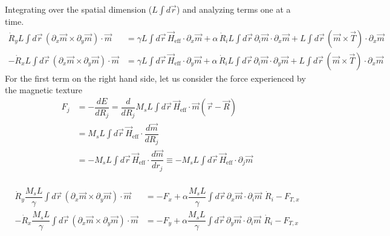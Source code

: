 \documentclass[aps,prb,onecolumn,notitlepage,showpacs,floatfix,superscriptaddress]{revtex4-1}
\newcommand{\mrm}[1]{\mathrm{#1}}
\begin{document}
Integrating over the spatial dimension ($L\int d\vec{r}$) and analyzing terms one at a time. 
\begin{equation}
\begin{split}
\dot{R}_y L\int d\vec{r}\,(\partial_x \vec{m} \times \partial_y \vec{m}) \cdot  \vec{m} &= \gamma L\int d\vec{r}\,\vec{H}_\mrm{eff} \cdot \partial_x \vec{m} + \alpha \, \dot{R}_i L\int d\vec{r}\, \partial_i \vec{m} \cdot \partial_x \vec{m} + L\int d\vec{r}\, (\vec{m} \times \vec{T}) \cdot \partial_x \vec{m}\\
-\dot{R}_x L\int d\vec{r}\, (\partial_x \vec{m} \times \partial_y \vec{m}) \cdot  \vec{m} &= \gamma L\int d\vec{r}\,\vec{H}_\mrm{eff} \cdot \partial_y \vec{m} + \alpha \, \dot{R}_i L\int d\vec{r}\, \partial_i \vec{m} \cdot \partial_y \vec{m} + L\int d\vec{r}\, (\vec{m} \times \vec{T}) \cdot \partial_x \vec{m}
\end{split}
\end{equation}
For the first term on the right hand side, let us consider the force experienced by the magnetic texture
\begin{equation}
\begin{split}
F_j &= - \dfrac{dE}{dR_j} = \dfrac{d}{dR_j} M_s L \int d\vec{r} \, \vec{H}_\mrm{eff} \cdot \vec{m}(\vec{r}-\vec{R}) \\
&=  M_s L \int d\vec{r} \, \vec{H}_\mrm{eff} \cdot \dfrac{d \vec{m}}{dR_j} \\
&= - M_s L \int d\vec{r} \, \vec{H}_\mrm{eff} \cdot \dfrac{d \vec{m}}{dr_j} \equiv - M_s L \int d\vec{r} \, \vec{H}_\mrm{eff} \cdot \partial_j \vec{m}\\
\end{split}
\end{equation}
\begin{widetext}
\begin{equation}
\begin{split}
\dot{R}_y \dfrac{M_s L}{\gamma}\int d\vec{r}\,(\partial_x \vec{m} \times \partial_y \vec{m}) \cdot  \vec{m} &= -F_x + \alpha \dfrac{M_s L}{\gamma} \int d\vec{r}\, \partial_x \vec{m} \cdot \partial_i \vec{m} \,\, \dot{R}_i  - F_{T,x}\\
-\dot{R}_x \dfrac{M_s L}{\gamma}\int d\vec{r}\, (\partial_x \vec{m} \times \partial_y \vec{m}) \cdot  \vec{m} &= -F_y + \alpha \dfrac{M_s L}{\gamma} \int d\vec{r}\, \partial_y \vec{m} \cdot \partial_i \vec{m} \,\, \dot{R}_i  - F_{T,x}\\
\end{split}
\end{equation}
\end{widetext}
\end{document}
